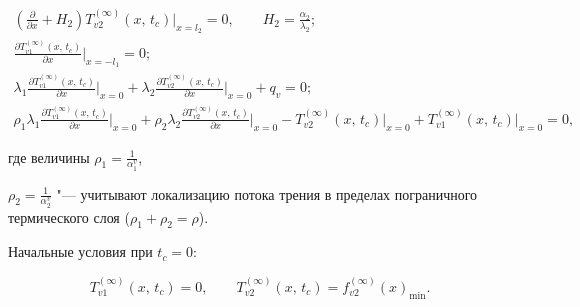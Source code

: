 \begin{gather}

\label{evdok:eq27}

\left(\frac{\partial }{\partial x} + H_2  \right)

T_{v2}^{(\infty )} (x,\,t_c )\Big|_{x = l_2 } = 0,

\qquad

H_2 = \frac{\alpha _2}{\lambda _2};

\\

\label{evdok:eq28}

\frac{\partial T_{v1}^{(\infty )} (x,\,t_c )}{\partial x}\Big|_{x = -l_1 }  = 

0;

\\

\label{evdok:eq29}

\lambda _1 \frac{\partial T_{v1}^{(\infty )} (x,\,t_c )}{\partial x}\Big|_{x = 0} + 

\lambda _2 \frac{\partial T_{v2}^{(\infty )} (x,\,t_c )}{\partial x}\Big|_{x = 0}   + q_v = 0;

\\

\label{evdok:eq30}

\rho _1 \lambda _1 \frac{\partial T_{v1}^{(\infty )} (x,\,t_c )}{\partial x}\Big|_{x = 0} + 

\rho _2 \lambda _2 \frac{\partial T_{v2}^{(\infty )} (x,\,t_c )}{\partial x}\Big|_{x = 0} - 

T_{v2}^{(\infty )} (x,\,t_c )\Big|_{x = 0} + T_{v1}^{(\infty )} (x,\,t_c )\Big|_{x = 0} = 

0,

\end{gather}

где величины  $\rho _1 = \frac1{\alpha _1^v}$,

$\rho _2 = \frac1{\alpha _2^v}$ "--- учитывают локализацию потока трения в пределах пограничного термического слоя ($\rho _1 + \rho _2= \rho$).





Начальные условия при $t_c=0$:

\begin{equation}

\label{evdok:eq31}

T_{v1}^{(\infty )} (x,\,t_c ) = 0,\qquad T_{v2}^{(\infty )} (x,\,t_c ) = 

f_{v2}^{(\infty )} (x)_{\min }.

\end{equation}





